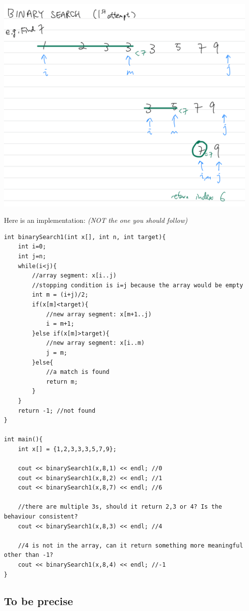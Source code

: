 \includegraphics[width=13cm]{images/ch7-binarysearch1.png}
\pagebreak

Here is an implementation: \textit{(NOT the one you should follow)}

\begin{lstlisting}
int binarySearch1(int x[], int n, int target){
    int i=0;
    int j=n;
    while(i<j){
        //array segment: x[i..j)
        //stopping condition is i=j because the array would be empty
        int m = (i+j)/2;
        if(x[m]<target){
            //new array segment: x[m+1..j)
            i = m+1;
        }else if(x[m]>target){
            //new array segment: x[i..m)
            j = m;
        }else{
            //a match is found
            return m;
        }
    }
    return -1; //not found
}

int main(){
    int x[] = {1,2,3,3,3,5,7,9};

    cout << binarySearch1(x,8,1) << endl; //0 
    cout << binarySearch1(x,8,2) << endl; //1
    cout << binarySearch1(x,8,7) << endl; //6

    //there are multiple 3s, should it return 2,3 or 4? Is the behaviour consistent?
    cout << binarySearch1(x,8,3) << endl; //4

    //4 is not in the array, can it return something more meaningful other than -1?
    cout << binarySearch1(x,8,4) << endl; //-1
}
\end{lstlisting}

\pagebreak

\subsection*{To be precise}

